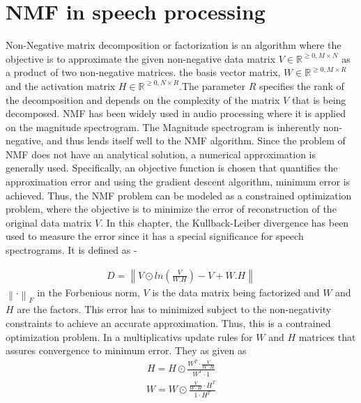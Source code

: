 \chapter{NMF in speech processing}  %



Non-Negative matrix decomposition or factorization is an algorithm where the objective is to approximate the given non-negative data matrix  $V \in \mathbb{R}^{\geq 0, M \times N}$ as a product of two non-negative matrices. the basis vector matrix,  $W \in \mathbb{R}^{\geq 0, M \times R}$ and the activation matrix $H \in \mathbb{R}^{\geq 0, N \times R}$.The parameter $R$ specifies the rank of the decomposition and depends on the complexity of the matrix $V$ that is being decomposed. NMF has been widely used in audio processing where it is applied on the magnitude spectrogram. The Magnitude spectrogram is inherently non-negative, and thus lends itself well to the NMF algorithm.
Since the problem of NMF does not have an analytical solution, a numerical approximation is generally used. Specifically, an objective function is chosen that quantifies the approximation error and using the gradient descent algorithm, minimum error is achieved. Thus, the NMF problem can be modeled as a constrained optimization problem, where the objective is to minimize the error of reconstruction of the original data matrix $V$. In this chapter, the Kullback-Leiber divergence has been used to measure the error since it has a special significance for speech spectrograms. It is defined as - 

\begin{align}
D = \left \| V \odot ln \left (  \frac{V}{W.H} \right ) -V +W.H \right \| \label{kldiv}
\end{align}
 $\left \| \cdot  \right \|_F$ in the Forbenious norm, $V$ is the data matrix being factorized and $W$ and $H$ are the factors.
This error has to minimized subject to the non-negativity constraints to achieve an accurate approximation. Thus, this is a contrained optimization problem. In \cite{lee} a multiplicativs update rules for $W$ and $H$ matrices that assures convergence to minimum error. They as given as
\begin{align}
H = H \odot \frac{W^T \cdot \frac{V}{W\cdot H} }{W^T\cdot 1} \label{H updates}
\end{align}
\begin{align}
W = W \odot \frac{\frac{V}{W\cdot H}\cdot H^T   }{ 1 \cdot H^T} \label{W updates}
\end{align}

